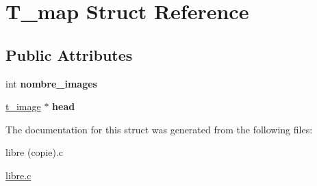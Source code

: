 \hypertarget{structT__map}{\section{T\-\_\-map Struct Reference}
\label{structT__map}
}
\subsection*{Public Attributes}
\begin{DoxyCompactItemize}
\item 
\hypertarget{structT__map_a85bbcb24ec17917d93f2c3d0dca0db35}{int {\bfseries nombre\-\_\-images}}\label{structT__map_a85bbcb24ec17917d93f2c3d0dca0db35}

\item 
\hypertarget{structT__map_a21635903f58f8575987a8808330c487a}{\hyperlink{structt__image}{t\-\_\-image} $\ast$ {\bfseries head}}\label{structT__map_a21635903f58f8575987a8808330c487a}

\end{DoxyCompactItemize}


The documentation for this struct was generated from the following files\-:\begin{DoxyCompactItemize}
\item 
libre (copie).\-c\item 
\hyperlink{libre_8c}{libre.\-c}\end{DoxyCompactItemize}
